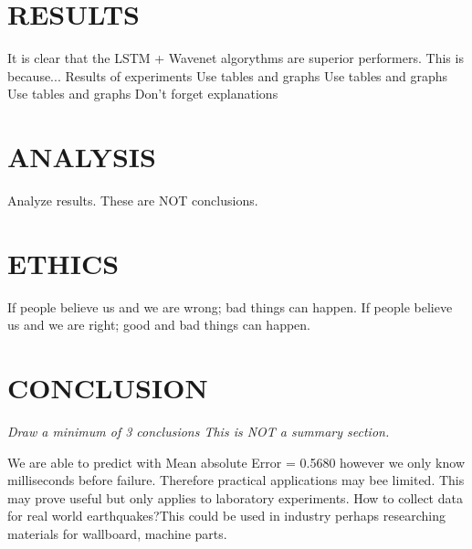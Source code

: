 \documentclass[]{llncs}
\begin{document}
\section{RESULTS}

It is clear that the LSTM + Wavenet algorythms are superior performers.
This is because...
Results of experiments
Use tables and graphs
Use tables and graphs
Use tables and graphs
Don't forget explanations
\section{ANALYSIS}
Analyze results.
These are NOT conclusions.
\section{ETHICS}
If people believe us and we are wrong; bad things can happen. If people believe us and we are right; good and bad things can happen.
\section{CONCLUSION}
{\em Draw a minimum of 3 conclusions  This is NOT a summary section.} 
\par

We are able to predict with Mean absolute Error = 0.5680 however we  only know milliseconds before failure. Therefore practical applications may bee limited. This may prove useful but only applies to laboratory experiments. How to collect data for real world earthquakes?This could be used in industry perhaps researching materials for wallboard, machine parts.
\par



\end{document}

